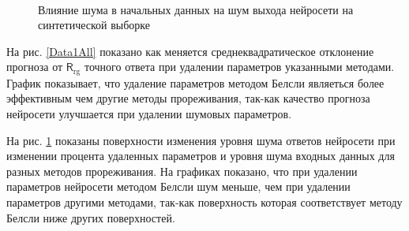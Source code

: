 \begin{figure}[h!t]\center
{}
\\
\caption{Влияние шума в начальных данных на шум выхода нейросети на синтетической выборке}
\label{Data1Noise}
\end{figure}

На рис. \ref{Data1All} показано как меняется среднеквадратическое отклонение прогноза от $\mathsf{R}_{\text{rg}}$ точного ответа при удалении параметров указанными методами. График показывает, что удаление параметров методом Белсли являеться более эффективным чем другие методы прореживания, так-как качество прогноза нейросети улучшается при удалении шумовых параметров.

На рис. \ref{Data1Noise} показаны поверхности изменения уровня шума ответов нейросети при изменении процента удаленных параметров и уровня шума входных данных для разных методов прореживания. На графиках показано, что при удалении параметров нейросети методом Белсли шум меньше, чем при удалении параметров другими методами, так-как поверхность которая соответствует методу Белсли ниже других поверхностей.
